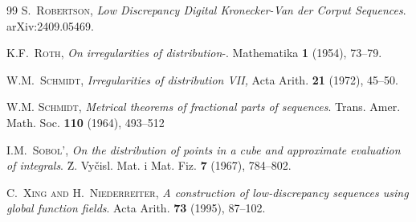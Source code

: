 \documentclass{article}
\renewcommand{\(}{\left (}
\renewcommand{\)}{\right )}
\theoremstyle{definition}
\numberwithin{equation}{section}
\begin{document}
\begin{thebibliography}{99}
 \textsc{S.~Robertson}, \textit{Low Discrepancy Digital Kronecker-Van der Corput Sequences}. arXiv:2409.05469.

  \textsc{K.F.~Roth}, \textit{On irregularities of distribution}-. {Mathematika} {\bf1} (1954), 73--79.
	
 \textsc{W.M.~Schmidt}, \textit{Irregularities of distribution VII,} {Acta Arith.} {{\bf21}} (1972), 45--50.
 
  \textsc{W.M. Schmidt}, \textit{Metrical theorems of fractional parts of sequences}.  Trans. Amer. Math. Soc. {\bf110} (1964), 493--512
  
 \textsc{I.M.~Sobol'}, \textit{On the distribution of points in a cube and
approximate evaluation of integrals}.
{\u{Z}. Vy\v{c}isl. Mat. i Mat. Fiz.} {{\bf7}} (1967), 784--802.	
	

\textsc{C.~Xing and H.~Niederreiter},
 \textit{A construction of low-discrepancy sequences using global function
  fields}.
 {{ Acta Arith.}} {\bf73} (1995), 87--102.

\end{thebibliography}
\end{document}
